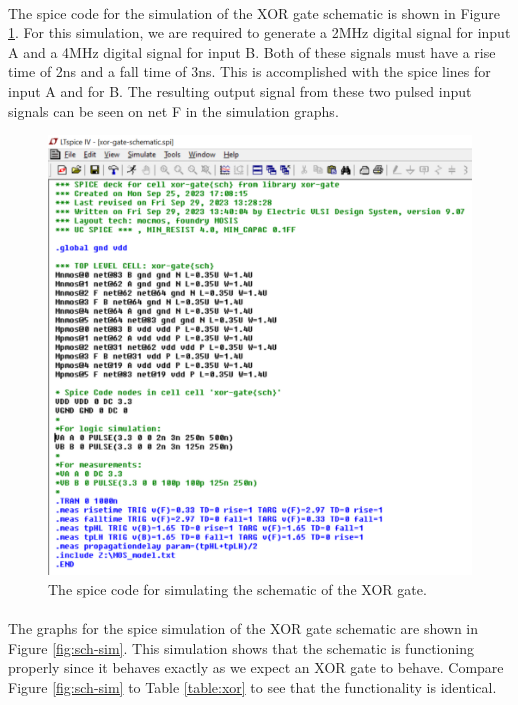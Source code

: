 \documentclass{article}
\begin{document}
  \paragraph{}
  The spice code for the simulation of the XOR gate schematic is shown in Figure \ref{fig:spice-sch}. For this simulation, we are required to generate a 2MHz digital signal for input A and a 4MHz digital signal for input B. Both of these signals must have a rise time of 2ns and a fall time of 3ns. This is accomplished with the spice lines  for input A and  for B. The resulting output signal from these two pulsed input signals can be seen on net F in the simulation graphs.


  \begin{figure}[H]
    \centering
    \includegraphics[width=0.9\linewidth, frame]{screenshots/spice-schematic.png}
    \caption{The spice code for simulating the schematic of the XOR gate.}
    \label{fig:spice-sch}
  \end{figure}

  \paragraph{}
  The graphs for the spice simulation of the XOR gate schematic are shown in Figure \ref{fig:sch-sim}. This simulation shows that the schematic is functioning properly since it behaves exactly as we expect an XOR gate to behave. Compare Figure \ref{fig:sch-sim} to Table \ref{table:xor} to see that the functionality is identical.
\end{document}
